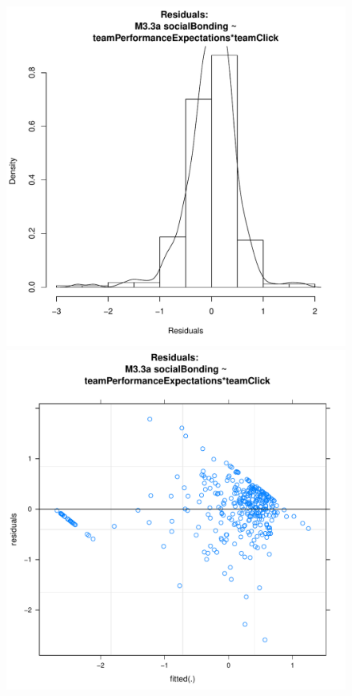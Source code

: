 \documentclass[12pt]{report}
\begin{document}
{\begin{figure}[htbp]
  \includegraphics[scale =.4]{../images/MLM33aHist.pdf}
  \includegraphics[scale =.4]{../images/MLM33aScatter.pdf}

\end{figure}}
\end{document}
